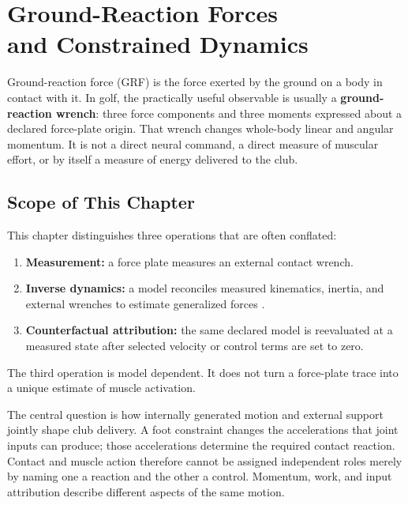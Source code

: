 \chapter[Ground-Reaction Forces and Constrained Dynamics]{Ground-Reaction Forces\\and Constrained Dynamics}\label{ch:grf}

Ground-reaction force (GRF) is the force exerted by the ground on a body in contact with it. In golf, the practically useful observable is usually a \textbf{ground-reaction wrench}: three force components and three moments expressed about a declared force-plate origin. That wrench changes whole-body linear and angular momentum. It is not a direct neural command, a direct measure of muscular effort, or by itself a measure of energy delivered to the club.

\section{Scope of This Chapter}\label{grf-scope-of-this-chapter}

This chapter distinguishes three operations that are often conflated:

\begin{enumerate}
\def\labelenumi{\arabic{enumi}.}
\item
  \textbf{Measurement:} a force plate measures an external contact wrench.
\item
  \textbf{Inverse dynamics:} a model reconciles measured kinematics, inertia, and external wrenches to estimate generalized forces \citep{Nesbit2005, Gatt1998}.
\item
  \textbf{Counterfactual attribution:} the same declared model is reevaluated at a measured state after selected velocity or control terms are set to zero.
\end{enumerate}

The third operation is model dependent. It does not turn a force-plate trace into a unique estimate of muscle activation.

The central question is how internally generated motion and external support jointly shape club delivery. A foot constraint changes the accelerations that joint inputs can produce; those accelerations determine the required contact reaction. Contact and muscle action therefore cannot be assigned independent roles merely by naming one a reaction and the other a control. Momentum, work, and input attribution describe different aspects of the same motion.

